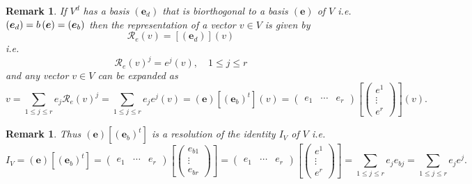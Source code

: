 \documentclass[aps,preprint]{revtex4}
\newtheorem{remark}[theorem]{Remark}
\begin{document}
\begin{remark}
If $V^{d}$ has a basis $\left( \boldsymbol{e}_{d}\right) $ that is
biorthogonal to a basis $\left( \boldsymbol{e}\right) $ of $V$ i.e. $\left( 
\boldsymbol{e}_{d}\right) =b\left( \boldsymbol{e}\right) =\left( \boldsymbol{%
e}_{b}\right) $ then the representation of a vector $v\in V$ is given by 
\begin{equation}
\mathcal{R}_{e}\left( v\right) =\left[ \left( \boldsymbol{e}_{d}\right) %
\right] \left( v\right)
\end{equation}%
i.e. 
\begin{equation}
\mathcal{R}_{e}\left( v\right) ^{j}=e^{j}\left( v\right) ,\quad 1\leq j\leq r
\end{equation}%
and any vector $v\in V$ can be expanded as 
\begin{equation}
v=\sum_{1\leq j\leq r}e_{j}\mathcal{R}_{e}\left( v\right) ^{j}=\sum_{1\leq
j\leq r}e_{j}e^{j}\left( v\right) =\left( \boldsymbol{e}\right) \left[
\left( \boldsymbol{e}_{b}\right) ^{t}\right] \left( v\right) =\left( 
\begin{array}{ccc}
e_{1} & \cdots & e_{r}%
\end{array}%
\right) \left[ \left( 
\begin{array}{c}
e^{1} \\ 
\vdots \\ 
e^{r}%
\end{array}%
\right) \right] \left( v\right) .
\end{equation}
\end{remark}

\begin{remark}
\label{Resolution of Identity} Thus $\left( \boldsymbol{e}\right) \left[
\left( \boldsymbol{e}_{b}\right) ^{t}\right] $ is \emph{a resolution of the
identity} $I_{V}$ of $V$ i.e. 
\begin{equation}
I_{V}=\left( \boldsymbol{e}\right) \left[ \left( \boldsymbol{e}_{b}\right)
^{t}\right] =\left( 
\begin{array}{ccc}
e_{1} & \cdots & e_{r}%
\end{array}%
\right) \left[ \left( 
\begin{array}{c}
e_{b1} \\ 
\vdots \\ 
e_{br}%
\end{array}%
\right) \right] =\left( 
\begin{array}{ccc}
e_{1} & \cdots & e_{r}%
\end{array}%
\right) \left[ \left( 
\begin{array}{c}
e^{1} \\ 
\vdots \\ 
e^{r}%
\end{array}%
\right) \right] =\sum_{1\leq j\leq r}e_{j}e_{bj}=\sum_{1\leq j\leq
r}e_{j}e^{j}.
\end{equation}
\end{remark}
\end{document}
